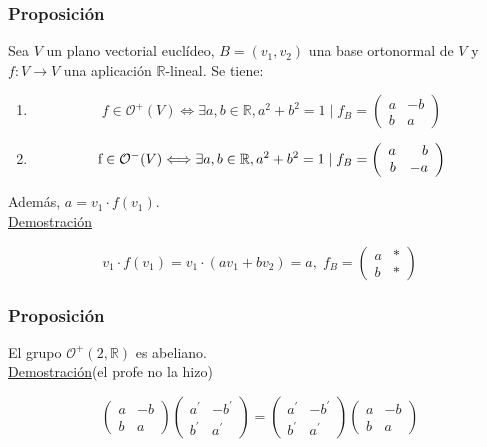 \documentclass[12pt, a4paper, ones, notitlepage, openany,titlepage]{article}
\newcommand{\demostracion}{\noindent\underline{Demostración}}
\begin{document}
\subsubsection{Proposición}
Sea $V$ un plano vectorial euclídeo, $B=\left(v_{1}, v_{2}\right)$ una base ortonormal de $V$ y $f: V \rightarrow V$ una aplicación $\mathbb{R}$-lineal. Se tiene:
\begin{enumerate}[label=(\arabic*)]
	\item $$ 
	f \in \mathcal{O}^{+}(V) \Longleftrightarrow \exists a, b \in \mathbb{R}, a^{2}+b^{2}=1 \mid f_{B}=\left(\begin{array}{rr}
		a & -b \\
		b & a
	\end{array}\right)
	$$
	\item $$
	\text f \in \mathcal{O}^{-}(V) \Longleftrightarrow \exists a, b \in \mathbb{R}, a^{2}+b^{2}=1 \mid f_{B}=\left(\begin{array}{rr}
		a & b \\
		b & -a
	\end{array}\right)
	$$
\end{enumerate}

\noindent Además, $a=v_{1} \cdot f\left(v_{1}\right)$.\\

\demostracion 

$$
v_1 \cdot f(v_1) = v_1 \cdot (av_1 + bv_2) = a, \; f_B =
\begin{pmatrix}
	a & * \\
	b & *
\end{pmatrix}
$$

\subsubsection{Proposición}
El grupo $\mathcal{O}^{+}(2, \mathbb{R})$ es abeliano.\\

\demostracion (el profe no la hizo)

$$
\left(\begin{array}{rr}
	a & -b \\
	b & a
\end{array}\right)\left(\begin{array}{rr}
	a^{\prime} & -b^{\prime} \\
	b^{\prime} & a^{\prime}
\end{array}\right)=\left(\begin{array}{rr}
	a^{\prime} & -b^{\prime} \\
	b^{\prime} & a^{\prime}
\end{array}\right)\left(\begin{array}{rr}
	a & -b \\
	b & a
\end{array}\right)
$$
\end{document}
